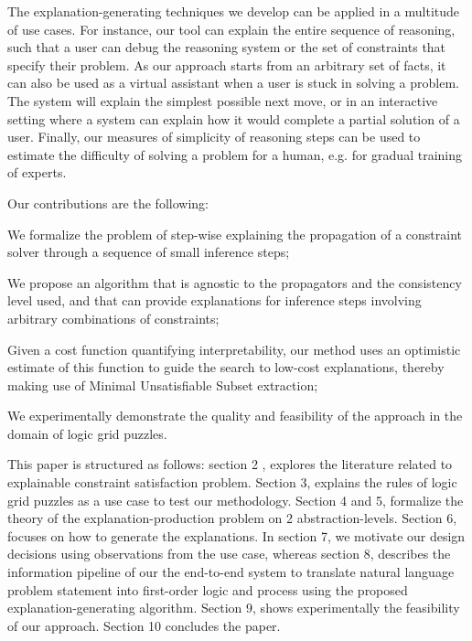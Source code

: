 The explanation-generating techniques we develop can be applied in a multitude of use cases. 
For instance, our tool can explain the entire sequence of reasoning, such that a user can debug the reasoning system or the set of constraints that specify their problem. 
As our approach starts from an arbitrary set of facts, it can also be used as a virtual assistant when a user is stuck in solving a problem.
The system will explain the simplest possible next move, or in an interactive setting where a system can explain how it would complete a partial solution of a user.
Finally, our measures of simplicity of reasoning steps can be used to estimate the difficulty of solving a problem for a human, e.g. for gradual training of experts.

\noindent Our contributions are the following:
\begin{compactitem}
	\item We formalize the problem of step-wise explaining the propagation of a constraint solver through a sequence of small inference steps;
	\item We propose an algorithm that is agnostic to the propagators and the consistency level used, and that can provide explanations for inference steps involving arbitrary combinations of constraints;
	\item Given a cost function quantifying interpretability, our method uses an optimistic estimate of this function to guide the search to low-cost explanations, thereby making use of Minimal Unsatisfiable Subset extraction;
	\item We experimentally demonstrate the quality and feasibility of the approach in the domain of logic grid puzzles.
\end{compactitem}

This paper is structured as follows: section 2 , explores the literature related to explainable constraint satisfaction problem. Section 3, explains the rules of logic grid puzzles as a use case to test our methodology. Section 4 and 5, formalize the theory of the explanation-production problem on 2 abstraction-levels. Section 6, focuses on how to generate the explanations. In section 7, we motivate our design decisions using observations from the use case, whereas section 8, describes the information pipeline of our the end-to-end system to translate natural language problem statement into first-order logic and process using the proposed explanation-generating algorithm. Section 9, shows experimentally the feasibility of our approach. Section 10 concludes the paper.